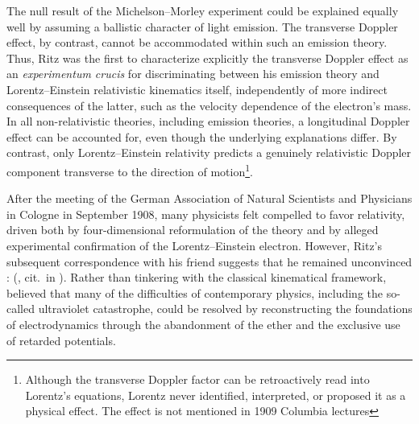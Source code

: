 \documentclass[submitted,12pt]{article}
\newcommand{\tDe}{transverse Doppler effect\xspace}
\begin{document}
%
The null result of the Michelson--Morley experiment could be explained equally well by assuming a ballistic character of light emission. The \tDe, by contrast, cannot be accommodated within such an emission theory. Thus, Ritz was the first to characterize explicitly the transverse Doppler effect as an \textit{experimentum crucis} for discriminating between his emission theory and Lorentz--Einstein relativistic kinematics itself, independently of more indirect consequences of the latter, such as the velocity dependence of the electron’s mass. In all non-relativistic theories, including emission theories, a longitudinal Doppler effect can be accounted for, even though the underlying explanations differ. By contrast, only Lorentz--Einstein relativity predicts a genuinely relativistic Doppler component transverse to the direction of motion\footnote{Although the transverse Doppler factor can be retroactively read into Lorentz’s equations, Lorentz never identified, interpreted, or proposed it as a physical effect. The effect is not mentioned in  1909 Columbia lectures}.

After the meeting of the German Association of Natural Scientists and Physicians in Cologne in September 1908, many physicists felt compelled to favor relativity, driven both by  four-dimensional reformulation of the theory and by  alleged experimental confirmation of the Lorentz--Einstein electron. However, Ritz’s subsequent correspondence with his friend \Ehr suggests that he remained unconvinced \citep[268--271]{Staley2008}:  (, cit.\ in \cite[270\psq\tm]{Staley2008}). Rather than tinkering with the classical kinematical framework, \citet{Ritz1908} believed that many of the difficulties of contemporary physics, including the so-called ultraviolet catastrophe, could be resolved by reconstructing the foundations of electrodynamics through the abandonment of the ether and the exclusive use of retarded potentials.

\end{document}
